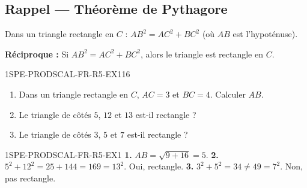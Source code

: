 

\subsection*{Rappel — Théorème de Pythagore}

Dans un triangle rectangle en $C$ : $AB^2 = AC^2 + BC^2$ (où $AB$ est l'hypoténuse).

\textbf{Réciproque :} Si $AB^2 = AC^2 + BC^2$, alors le triangle est rectangle en $C$.

\begin{exercice}{1SPE-PRODSCAL-FR-R5-EX1}{1}{6}
\begin{enumerate}
  \item Dans un triangle rectangle en $C$, $AC = 3$ et $BC = 4$. Calculer $AB$.
  \item Le triangle de côtés $5$, $12$ et $13$ est-il rectangle ?
  \item Le triangle de côtés $3$, $5$ et $7$ est-il rectangle ?
\end{enumerate}
\end{exercice}


\begin{corrige}{1SPE-PRODSCAL-FR-R5-EX1}
\textbf{1.} $AB = \sqrt{9 + 16} = 5$.
\textbf{2.} $5^2 + 12^2 = 25 + 144 = 169 = 13^2$. Oui, rectangle.
\textbf{3.} $3^2 + 5^2 = 34
\neq 49 = 7^2$. Non, pas rectangle.
\end{corrige}

